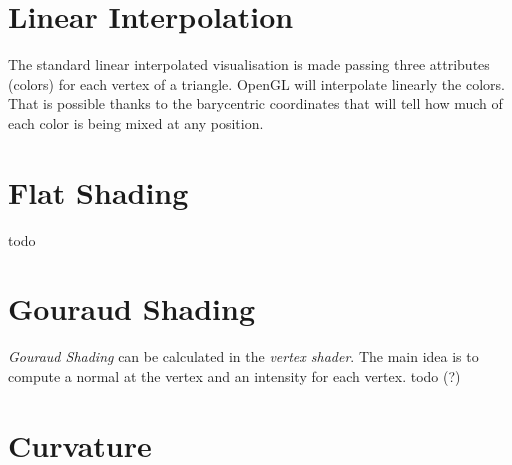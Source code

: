 
\section{Linear Interpolation}
The standard linear interpolated visualisation is made passing three attributes (colors) for each vertex of a triangle. OpenGL will interpolate linearly the colors. That is possible thanks to the barycentric coordinates that will tell how much of each color is being mixed at any position.


\section{Flat Shading}
todo


\section{Gouraud Shading}
\textit{Gouraud Shading} can be calculated in the \textit{vertex shader}. The main idea is to compute a normal at the vertex and an intensity for each vertex.
todo (?)


\section{Curvature}
